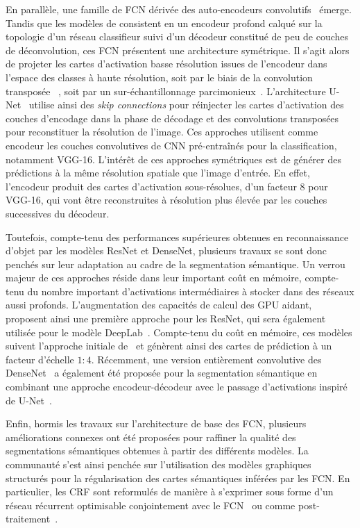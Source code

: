En parallèle, une famille de \gls{FCN} dérivée des auto-encodeurs convolutifs~\cite{zhao_stacked_2015} émerge. Tandis que les modèles de \citet{long_fully_2015} consistent en un encodeur profond calqué sur la topologie d'un réseau classifieur suivi d'un décodeur constitué de peu de couches de déconvolution, ces \gls{FCN} présentent une architecture symétrique. Il s'agit alors de projeter les cartes d'activation basse résolution issues de l'encodeur dans l'espace des classes à haute résolution, soit par le biais de la convolution transposée ~\cite{nekrasov_global_2016,noh_learning_2015}, soit par un sur-échantillonnage parcimonieux~\cite{badrinarayanan_segnet_2017}. L'architecture U-Net~\cite{ronneberger_u-net_2015} utilise ainsi des \emph{skip connections} pour réinjecter les cartes d'activation des couches d'encodage dans la phase de décodage et des convolutions transposées pour reconstituer la résolution de l'image. Ces approches utilisent comme encodeur les couches convolutives de \gls{CNN} pré-entraînés pour la classification, notamment VGG-16. L'intérêt de ces approches symétriques est de générer des prédictions à la même résolution spatiale que l'image d'entrée. En effet, l'encodeur produit des cartes d'activation sous-résolues, d'un facteur 8 pour VGG-16, qui vont être reconstruites à résolution plus élevée par les couches successives du décodeur.

Toutefois, compte-tenu des performances supérieures obtenues en reconnaissance d'objet par les modèles ResNet et DenseNet, plusieurs travaux se sont donc penchés sur leur adaptation au cadre de la segmentation sémantique. Un verrou majeur de ces approches réside dans leur important coût en mémoire, compte-tenu du nombre important d'activations intermédiaires à stocker dans des réseaux aussi profonds. L'augmentation des capacités de calcul des \gls{GPU} aidant, \citet{wu_high-performance_2016} proposent ainsi une première approche pour les ResNet, qui sera également utilisée pour le modèle DeepLab~\cite{l._c._chen_deeplab_2018}. Compte-tenu du coût en mémoire, ces modèles suivent l'approche initiale de~\cite{long_fully_2015} et génèrent ainsi des cartes de prédiction à un facteur d'échelle $1:4$. Récemment, une version entièrement convolutive des DenseNet~\cite{jegou_one_2017} a également été proposée pour la segmentation sémantique en combinant une approche encodeur-décodeur avec le passage d'activations inspiré de U-Net~\cite{ronneberger_u-net_2015}.

Enfin, hormis les travaux sur l'architecture de base des \gls{FCN}, plusieurs améliorations connexes ont été proposées pour raffiner la qualité des segmentations sémantiques obtenues à partir des différents modèles. La communauté s'est ainsi penchée sur l'utilisation des modèles graphiques structurés pour la régularisation des cartes sémantiques inférées par les \gls{FCN}. En particulier, les \gls{CRF} sont reformulés de manière à s'exprimer sous forme d'un réseau récurrent optimisable conjointement avec le \gls{FCN}~\cite{zheng_conditional_2015} ou comme post-traitement~\cite{arnab_higher_2015}.

